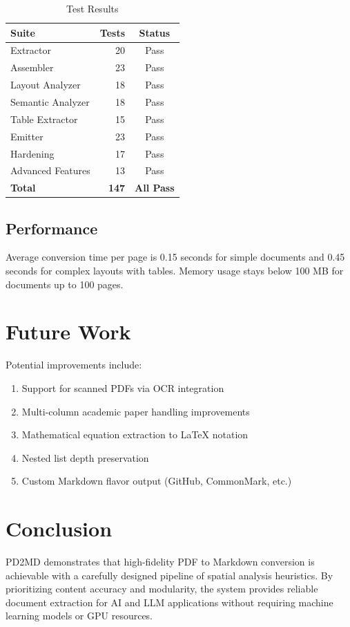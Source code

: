 \documentclass[12pt]{article}
\begin{document}
\begin{table}[h]
\centering
\caption{Test Results}
\begin{tabular}{lrc}
\toprule
\textbf{Suite} & \textbf{Tests} & \textbf{Status} \\
\midrule
Extractor & 20 & Pass \\
Assembler & 23 & Pass \\
Layout Analyzer & 18 & Pass \\
Semantic Analyzer & 18 & Pass \\
Table Extractor & 15 & Pass \\
Emitter & 23 & Pass \\
Hardening & 17 & Pass \\
Advanced Features & 13 & Pass \\
\midrule
\textbf{Total} & \textbf{147} & \textbf{All Pass} \\
\bottomrule
\end{tabular}
\end{table}

\subsection{Performance}
Average conversion time per page is 0.15 seconds for simple documents and
0.45 seconds for complex layouts with tables. Memory usage stays below 100 MB
for documents up to 100 pages.

\section{Future Work}
Potential improvements include:
\begin{enumerate}
    \item Support for scanned PDFs via OCR integration
    \item Multi-column academic paper handling improvements
    \item Mathematical equation extraction to LaTeX notation
    \item Nested list depth preservation
    \item Custom Markdown flavor output (GitHub, CommonMark, etc.)
\end{enumerate}

\section{Conclusion}
PD2MD demonstrates that high-fidelity PDF to Markdown conversion is achievable
with a carefully designed pipeline of spatial analysis heuristics. By prioritizing
content accuracy and modularity, the system provides reliable document extraction
for AI and LLM applications without requiring machine learning models or GPU
resources.
\end{document}
